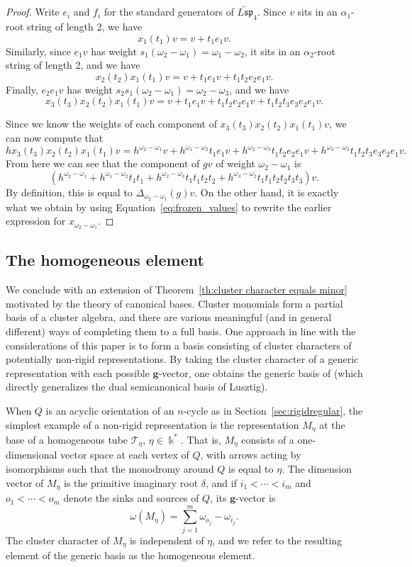 \documentclass[12pt]{amsart}
\newcommand{\sayDR}[1]{\say[DR]{\color{red}{\bf DR:}\;#1}}
\newcommand{\kk}{\Bbbk}
\newcommand{\bfg}{\mathbf{g}}
\newcommand{\gv}{\omega}
\newcommand{\grep}{\gv}
\newcommand{\ol}[1]{\overline{#1}}
\newcommand{\Qrep}{M}
\theoremstyle{remark}
\numberwithin{equation}{section}
\numberwithin{figure}{section}
\begin{document}
\begin{proof}
  Write $e_i$ and $f_i$ for the standard generators of $\widetilde{L\mathfrak{sp}}_4$.
  Since $v$ sits in an $\alpha_1$-root string of length 2, we have
  \[
    x_1(t_1)v = v + t_1e_1v.
  \]
  Similarly, since $e_1v$ has weight $s_1(\omega_2 - \omega_1) = \omega_1 - \omega_2$, it sits in an $\alpha_2$-root string of length 2, and we have
  \[
    x_2(t_2)x_1(t_1)v = v + t_1e_1v + t_1t_2e_2e_1v.
  \]
  Finally, $e_2e_1v$ has weight $s_2s_1(\omega_2 - \omega_1) = \omega_2 - \omega_3$, and we have
  \[
    x_3(t_3)x_2(t_2)x_1(t_1)v = v + t_1e_1v + t_1t_2e_2e_1v + t_1t_2t_3e_3e_2e_1v.
  \]

  Since we know the weights of each component of $x_3(t_3)x_2(t_2)x_1(t_1)v$, we can now compute that
  \[
    hx_3(t_3)x_2(t_2)x_1(t_1)v = h^{\omega_2-\omega_1}v + h^{\omega_1 - \omega_2}t_1e_1v + h^{\omega_2-\omega_3}t_1t_2e_2e_1v + h^{\omega_3-\omega_2}t_1t_2t_3e_3e_2e_1v.
  \]
  From here we can see that the component of $gv$ of weight $\omega_2 - \omega_1$ is
  \[
    (h^{\omega_2-\omega_1} + h^{\omega_1 - \omega_2}t_1t_{\ol{1}} + h^{\omega_2-\omega_3}t_1t_{\ol{1}}t_2t_{\ol{2}} + h^{\omega_3-\omega_2}t_1t_{\ol{1}}t_2t_{\ol{2}}t_3t_{\ol{3}})v.
  \]
  By definition, this is equal to $\Delta_{\omega_2-\omega_1}(g)v$.
  On the other hand, it is exactly what we obtain by using Equation~\eqref{eq:frozen_values} to rewrite the earlier expression for $x_{\omega_2 - \omega_1}$.
\end{proof}

\subsection{The homogeneous element}
We conclude with an extension of Theorem~\ref{th:cluster character equals minor} motivated by the theory of canonical bases.
Cluster monomials form a partial basis of a cluster algebra, and there are various meaningful (and in general different) ways of completing them to a full basis.
One approach in line with the considerations of this paper is to form a basis consisting of cluster characters of potentially non-rigid representations.
By taking the cluster character of a generic representation with each possible $\bfg$-vector, one obtains the generic basis of \cite{Dup12} (which directly generalizes the dual semicanonical basis of Lusztig\sayDR{reference needed?}).

When $Q$ is an acyclic orientation of an $n$-cycle as in Section~\ref{sec:rigidregular}, the simplest example of a non-rigid representation is the representation $\Qrep_\eta$ at the base of a homogeneous tube $\mathcal{T}_\eta$, $\eta \in \kk^*$.
That is, $\Qrep_\eta$ consists of a one-dimensional vector space at each vertex of $Q$, with arrows acting by isomorphisms such that the monodromy around $Q$ is equal to $\eta$.
The dimension vector of $\Qrep_\eta$ is the primitive imaginary root $\delta$, and if $i_1<\cdots<i_m$ and $o_1<\cdots < o_m$ denote the sinks and sources of $Q$, its $\bfg$-vector is
\[
  \grep(\Qrep_\eta) = \sum_{j=1}^m \omega_{o_j} - \omega_{i_j}.
\]
The cluster character of $\Qrep_\eta$ is independent of $\eta$, and we refer to the resulting element of the generic basis as the homogeneous element.
\end{document}
